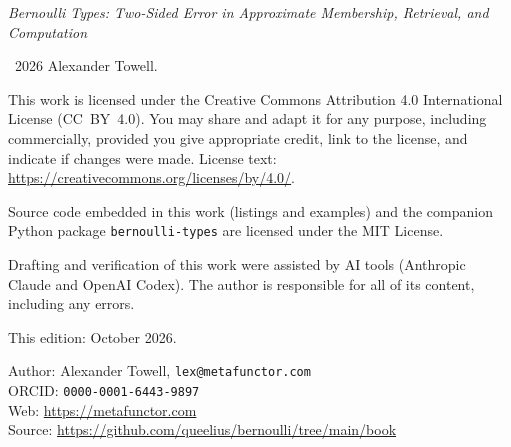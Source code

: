 \thispagestyle{empty}
\vspace*{\fill}
\noindent
\textit{Bernoulli Types: Two-Sided Error in Approximate Membership,
Retrieval, and Computation}

\medskip

\noindent
\textcopyright\ 2026 Alexander Towell.

\bigskip

\noindent
This work is licensed under the Creative Commons Attribution 4.0
International License (CC~BY~4.0). You may share and adapt it for any
purpose, including commercially, provided you give appropriate credit,
link to the license, and indicate if changes were made. License text:
\url{https://creativecommons.org/licenses/by/4.0/}.

\bigskip

\noindent
Source code embedded in this work (listings and examples) and the
companion Python package \texttt{bernoulli-types} are licensed under the
MIT License.

\bigskip

\noindent
Drafting and verification of this work were assisted by AI tools
(Anthropic Claude and OpenAI Codex). The author is responsible for all of
its content, including any errors.

\bigskip

\noindent
This edition: October 2026.

\bigskip

\noindent
Author: Alexander Towell, \texttt{lex@metafunctor.com}\\
ORCID: \texttt{0000-0001-6443-9897}\\
Web: \url{https://metafunctor.com}\\
Source: \url{https://github.com/queelius/bernoulli/tree/main/book}
\vspace*{\fill}
\clearpage
